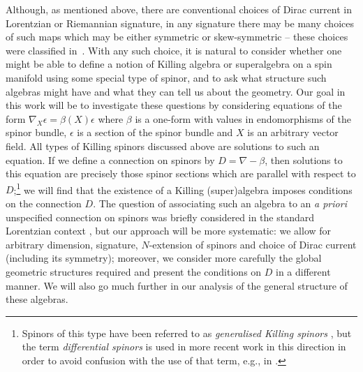 \documentclass[10pt,a4paper]{amsart}
\numberwithin{equation}{section}
\newcommand{\1}{\mathbbm{1}}
\begin{document}
Although, as mentioned above, there are conventional choices of Dirac current in Lorentzian or Riemannian signature, in any signature there may be many choices of such maps which may be either symmetric or skew-symmetric -- these choices were classified in~\cite{Alekseevsky1997}. With any such choice, it is natural to consider whether one might be able to define a notion of Killing algebra or superalgebra on a spin manifold using some special type of spinor, and to ask what structure such algebras might have and what they can tell us about the geometry. Our goal in this work will be to investigate these questions by considering equations of the form
$\nabla_X \epsilon = \beta(X) \epsilon
$
where $\beta$ is a one-form with values in endomorphisms of the spinor bundle, $\epsilon$ is a section of the spinor bundle and $X$ is an arbitrary vector field. All types of Killing spinors discussed above are solutions to such an equation. If we define a connection on spinors by $D=\nabla-\beta$, then solutions to this equation are precisely those spinor sections which are parallel with respect to $D$;\footnote{Spinors of this type have been referred to as \emph{generalised Killing spinors} \cite{Cortes2021,Lazaroiu2016}, but the term \emph{differential spinors} is used in more recent work in this direction \cite{Shahbazi2024_2,Shahbazi2024_1} in order to avoid confusion with the use of that term, e.g., in \cite{Bar2005,Moroianu2014}.}
we will find that the existence of a Killing (super)algebra imposes conditions on the connection $D$. The question of associating such an algebra to an \textit{a priori} unspecified connection on spinors was briefly considered in the standard Lorentzian context \cite{Hustler2016}, but our approach will be more systematic: we allow for arbitrary dimension, signature, $N$-extension of spinors and choice of Dirac current (including its symmetry); moreover, we consider more carefully the global geometric structures required and present the conditions on $D$ in a different manner. We will also go much further in our analysis of the general structure of these algebras.
\end{document}
